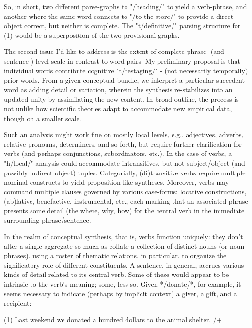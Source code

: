 So, in short, two different parse-graphs %
to "/heading/" to yield a verb-phrase, and another where the same word 
connects to "/to the store/" to provide a direct object %
correct, but neither is complete.  The "t/definitive/" parsing 
structure for (1) would be a superposition of the two provisional graphs.

The second issue I'd like to address is the extent of complete phrase- 
(and sentence-) level scale in contrast to word-pairs.  
My preliminary proposal is that individual words contribute 
cognitive "t/restaging/" -%
(not necessarily temporally) prior words.  From a 
given conceptual bundle, we 
interpret a particular succedent word as adding detail or 
variation, wherein the synthesis re-stabilizes into 
an updated unity by assimilating the new content.  
In broad outline, the process is not unlike 
how scientific theories adapt to accommodate new 
empirical data, though on a smaller scale.

Such an analysis might work fine on mostly 
local levels, e.g., adjectives, adverbs, relative 
pronouns, determiners, and so forth, but require 
further clarification for verbs (and perhaps conjunctions, 
subordinators, etc.).  In the case of verbs, a 
"h/local/" analysis could accommodate intransitives, 
but not subject/object (and possibly indirect object) 
tuples.  Categorially, (di)transitive verbs 
require multiple nominal constructs to 
yield proposition-like syntheses.  Moreover, 
verbs may command multiple clauses governed 
by various case-forms: locative constructions, 
(ab)lative, benefactive, instrumental, etc., each marking 
that an associated phrase presents some detail 
(the where, why, how) for the central verb 
in the immediate surrounding phrase/sentence.

In the realm of conceptual synthesis, that is, verbs 
function uniquely: they don't alter a single aggregate so 
much as collate a collection of distinct nouns 
(or noun-phrases), using a roster of thematic relations, 
in particular, to organize 
the significatory role of different constituents.  
A sentence, in general, accrues various kinds of detail 
related to its central verb.  Some of these 
would appear to be intrinsic to the verb's meaning; some, less 
so.  Given */donate/*, for example, it seems necessary 
to indicate (perhaps by implicit context) a giver, a gift, 
and a recipient:

(1)  Last weekend we donated a hundred dollars to the animal shelter.
/+

